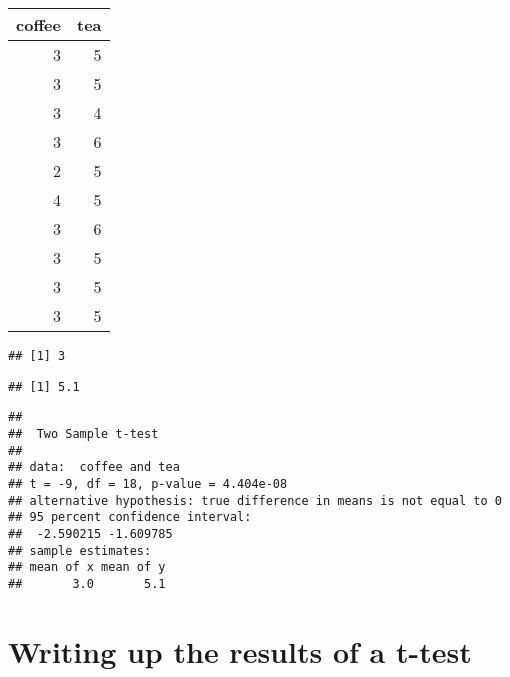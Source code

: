 \begin{tabular}{r|r}
\hline
coffee & tea\\
\hline
3 & 5\\
\hline
3 & 5\\
\hline
3 & 4\\
\hline
3 & 6\\
\hline
2 & 5\\
\hline
4 & 5\\
\hline
3 & 6\\
\hline
3 & 5\\
\hline
3 & 5\\
\hline
3 & 5\\
\hline
\end{tabular}

\begin{Shaded}
\begin{Highlighting}[]
\end{Highlighting}
\end{Shaded}

\begin{verbatim}
## [1] 3
\end{verbatim}

\begin{Shaded}
\begin{Highlighting}[]
\end{Highlighting}
\end{Shaded}

\begin{verbatim}
## [1] 5.1
\end{verbatim}

\begin{Shaded}
\begin{Highlighting}[]
\NormalTok{)}
\end{Highlighting}
\end{Shaded}

\begin{verbatim}
## 
##  Two Sample t-test
## 
## data:  coffee and tea
## t = -9, df = 18, p-value = 4.404e-08
## alternative hypothesis: true difference in means is not equal to 0
## 95 percent confidence interval:
##  -2.590215 -1.609785
## sample estimates:
## mean of x mean of y 
##       3.0       5.1
\end{verbatim}

\section{Writing up the results of a
t-test}\label{writing-up-the-results-of-a-t-test}

